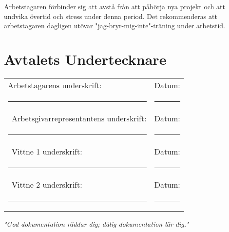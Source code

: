\documentclass[a4paper,11pt]{article}
\begin{document}
Arbetstagaren förbinder sig att avstå från att påbörja nya projekt och att undvika övertid och stress under denna period. Det rekommenderas att arbetstagaren dagligen utövar "jag-bryr-mig-inte"-träning under arbetstid.

\section*{Avtalets Undertecknare}

\vspace{2em}
\noindent\begin{tabular}{@{}p{8cm}p{8cm}@{}}
Arbetstagarens underskrift: & Datum: \\
\rule{8cm}{0.4pt} & \rule{8cm}{0.4pt} \\\
Arbetsgivarrepresentantens underskrift: & Datum: \\
\rule{8cm}{0.4pt} & \rule{8cm}{0.4pt} \\\
Vittne 1 underskrift: & Datum: \\
\rule{8cm}{0.4pt} & \rule{8cm}{0.4pt} \\\
Vittne 2 underskrift: & Datum: \\
\rule{8cm}{0.4pt} & \rule{8cm}{0.4pt}
\end{tabular}

\vfill

\begin{center}
    \textit{"God dokumentation räddar dig; dålig dokumentation lär dig."}
\end{center}
\end{document}
